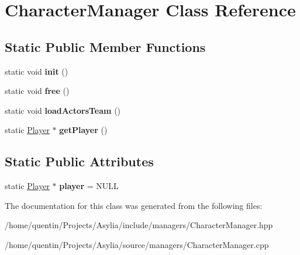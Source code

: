 \hypertarget{classCharacterManager}{\section{Character\-Manager Class Reference}
\label{classCharacterManager}
}
\subsection*{Static Public Member Functions}
\begin{DoxyCompactItemize}
\item 
\hypertarget{classCharacterManager_a6df9544850a7358a73893eebb40bcffe}{static void {\bfseries init} ()}\label{classCharacterManager_a6df9544850a7358a73893eebb40bcffe}

\item 
\hypertarget{classCharacterManager_ace9949f5f95c9dd0e1a5214f6521a792}{static void {\bfseries free} ()}\label{classCharacterManager_ace9949f5f95c9dd0e1a5214f6521a792}

\item 
\hypertarget{classCharacterManager_a46ce5a4d305031a6c8192ac76394295d}{static void {\bfseries load\-Actors\-Team} ()}\label{classCharacterManager_a46ce5a4d305031a6c8192ac76394295d}

\item 
\hypertarget{classCharacterManager_ad6520b939f17da0de509f8959f98f5f6}{static \hyperlink{classPlayer}{Player} $\ast$ {\bfseries get\-Player} ()}\label{classCharacterManager_ad6520b939f17da0de509f8959f98f5f6}

\end{DoxyCompactItemize}
\subsection*{Static Public Attributes}
\begin{DoxyCompactItemize}
\item 
\hypertarget{classCharacterManager_a92ee7a14dd1ad68b1ffbb5d5b5a627f4}{static \hyperlink{classPlayer}{Player} $\ast$ {\bfseries player} = N\-U\-L\-L}\label{classCharacterManager_a92ee7a14dd1ad68b1ffbb5d5b5a627f4}

\end{DoxyCompactItemize}


The documentation for this class was generated from the following files\-:\begin{DoxyCompactItemize}
\item 
/home/quentin/\-Projects/\-Asylia/include/managers/Character\-Manager.\-hpp\item 
/home/quentin/\-Projects/\-Asylia/source/managers/Character\-Manager.\-cpp\end{DoxyCompactItemize}
